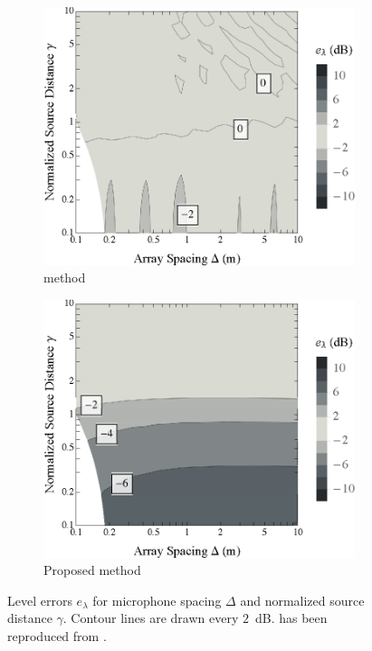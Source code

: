 \begin{figure}[t]
	\centering
	\begin{subfigure}[b]{0.49\textwidth}
		\includegraphics[width=\textwidth]{09_thiergart_comparison/figures/audibleEnergy_contour_thiergart.eps}
		\caption{\citet{Thiergart2013} method}
		\label{fig:09_Thiergart_Comparison:Level_Errors:Thiergart}
	\end{subfigure}
	\hfill
	\begin{subfigure}[b]{0.49\textwidth}
		\includegraphics[width=\textwidth]{08_proposed_method/figures/audibleEnergy_contour_validhybrid.eps}
		\caption{Proposed method}
		\label{fig:09_Thiergart_Comparison:Level_Errors:Hybrid}
	\end{subfigure}
	
	\caption[Contour plots of level errors for each interpolation method.]{
	Level errors $e_\lambda$ for microphone spacing $\Delta$ and normalized source distance $\gamma$.
  Contour lines are drawn every $2$~dB.
   has been reproduced from .}
	\label{fig:09_Thiergart_Comparison:Level_Errors}
\end{figure}

